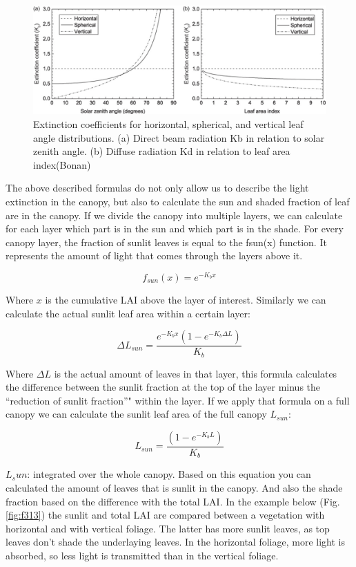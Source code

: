 \documentclass[12pt,oneside]{book}
\begin{document}
\begin{figure}

{\centering \includegraphics[width=0.8\linewidth]{figures/chap3/f312_Kb_angle} 

}

\caption{Extinction coefficients for horizontal, spherical, and vertical leaf angle distributions. (a) Direct beam radiation Kb in relation to solar zenith angle. (b) Diffuse radiation Kd in relation to leaf area index(Bonan)}\label{fig:f312}
\end{figure}

The above described formulas do not only allow us to describe the light
extinction in the canopy, but also to calculate the sun and shaded
fraction of leaf are in the canopy. If we divide the canopy into
multiple layers, we can calculate for each layer which part is in the
sun and which part is in the shade. For every canopy layer, the fraction
of sunlit leaves is equal to the fsun(x) function. It represents the
amount of light that comes through the layers above it.

\[
f_{sun} (x) = e^{-K_b x}
\]

Where \(x\) is the cumulative LAI above the layer of interest. Similarly
we can calculate the actual sunlit leaf area within a certain layer:

\[
\Delta L_{sun} = \frac{e^{-K_b x} \left(1 - e^{-K_b \Delta L} \right)}{K_b}
\]

Where \(\Delta L\) is the actual amount of leaves in that layer, this
formula calculates the difference between the sunlit fraction at the top
of the layer minus the ``reduction of sunlit fraction''" within the
layer. If we apply that formula on a full canopy we can calculate the
sunlit leaf area of the full canopy \(L_{sun}\):

\[
L_{sun} = \frac{\left(1 - e^{-K_b  L} \right)}{K_b}
\]

\(L_sun\): integrated over the whole canopy. Based on this equation you
can calculated the amount of leaves that is sunlit in the canopy. And
also the shade fraction based on the difference with the total LAI. In
the example below (Fig. \ref{fig:f313}) the sunlit and total LAI are
compared between a vegetation with horizontal and with vertical foliage.
The latter has more sunlit leaves, as top leaves don't shade the
underlaying leaves. In the horizontal foliage, more light is absorbed,
so less light is transmitted than in the vertical foliage.
\end{document}
